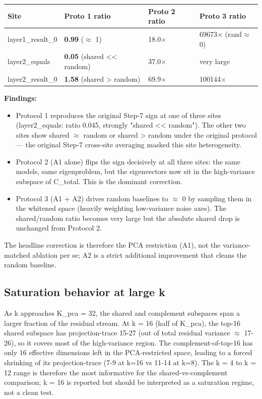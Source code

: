 \begin{center}
\begin{tabular}{|l|l|l|l|}
\hline
\textbf{Site} & \textbf{Proto 1 ratio} & \textbf{Proto 2 ratio} & \textbf{Proto 3 ratio} \\
\hline
layer1\_result\_0 & \textbf{0.99} ($\approx$ 1) & 18.0$\times$ & 69673$\times$ (rand$\approx$0) \\
layer2\_equals & \textbf{0.05} (shared << random) & 37.0$\times$ & very large \\
layer2\_result\_0 & \textbf{1.58} (shared > random) & 69.9$\times$ & 100144$\times$ \\
\hline
\end{tabular}
\end{center}


\textbf{Findings:}

\begin{itemize}
  \item Protocol 1 reproduces the original Step-7 sign at one of three sites (layer2\_equals: ratio 0.045, strongly "shared << random"). The other two sites show shared $\approx$ random or shared > random under the original protocol --- the original Step-7 cross-site averaging masked this site heterogeneity.
  \item Protocol 2 (A1 alone) flips the sign decisively at all three sites: the same models, same eigenproblem, but the eigenvectors now sit in the high-variance subspace of C\_total. This is the dominant correction.
  \item Protocol 3 (A1 + A2) drives random baselines to $\approx$ 0 by sampling them in the whitened space (heavily weighting low-variance noise axes). The shared/random ratio becomes very large but the absolute shared drop is unchanged from Protocol 2.
\end{itemize}

The headline correction is therefore the PCA restriction (A1), not the
variance-matched ablation per se; A2 is a strict additional improvement
that cleans the random baseline.

\subsection{Saturation behavior at large k}

As k approaches K\_pca = 32, the shared and complement subspaces span a
larger fraction of the residual stream. At k = 16 (half of K\_pca), the
top-16 shared subspace has projection-trace 15-27 (out of total residual
variance $\approx$ 17-26), so it covers most of the high-variance region. The
complement-of-top-16 has only 16 effective dimensions left in the
PCA-restricted space, leading to a forced shrinking of its
projection-trace (7-9 at k=16 vs 11-14 at k=8). The k = 4 to k = 12
range is therefore the most informative for the shared-vs-complement
comparison; k = 16 is reported but should be interpreted as a
saturation regime, not a clean test.

